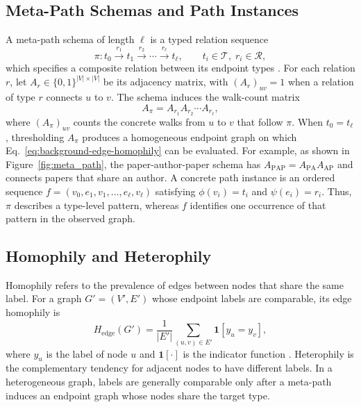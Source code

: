 \documentclass[sigconf,anonymous,review]{acmart}
\begin{document}
\subsection{Meta-Path Schemas and Path Instances}
A meta-path schema of length $\ell$ is a typed relation sequence
\begin{equation}
  \pi:
  t_0 \xrightarrow{r_1} t_1 \xrightarrow{r_2}\cdots
  \xrightarrow{r_\ell} t_\ell,
  \qquad t_i\in\mathcal{T},\; r_i\in\mathcal{R},
  \label{eq:background-metapath-schema}
\end{equation}
which specifies a composite relation between its endpoint types \cite{sun2011pathsim}. For each
relation $r$, let $A_r\in\{0,1\}^{|V|\times|V|}$ be its adjacency matrix, with
$(A_r)_{uv}=1$ when a relation of type $r$ connects $u$ to $v$. The schema induces the walk-count
matrix
\begin{equation}
  A_\pi=A_{r_1}A_{r_2}\cdots A_{r_\ell},
  \label{eq:background-metapath-adjacency}
\end{equation}
where $(A_\pi)_{uv}$ counts the concrete walks from $u$ to $v$ that follow $\pi$. When
$t_0=t_\ell$, thresholding $A_\pi$ produces a homogeneous endpoint graph on which
Eq.~\eqref{eq:background-edge-homophily} can be evaluated. For example, as shown in
Figure~\ref{fig:meta_path}, the
paper-author-paper schema has $A_{\mathrm{PAP}}=A_{\mathrm{PA}}A_{\mathrm{AP}}$ and connects
papers that share an author. A concrete path instance is an ordered sequence
$f=(v_0,e_1,v_1,\ldots,e_\ell,v_\ell)$ satisfying $\phi(v_i)=t_i$ and $\psi(e_i)=r_i$. Thus,
$\pi$ describes a type-level pattern, whereas $f$ identifies one occurrence of that pattern in
the observed graph.

\subsection{Homophily and Heterophily}
Homophily refers to the prevalence of edges between nodes that share the same label. For a graph
$G'=(V',E')$ whose endpoint labels are comparable, its edge homophily is
\begin{equation}
  H_{\mathrm{edge}}(G')
  = \frac{1}{|E'|}\sum_{(u,v)\in E'}\mathbf{1}[y_u=y_v],
  \label{eq:background-edge-homophily}
\end{equation}
where $y_u$ is the label of node $u$ and $\mathbf{1}[\cdot]$ is the indicator function
\cite{zhu2020beyond}. Heterophily is the complementary tendency for adjacent nodes to have
different labels. In a heterogeneous graph, labels are generally comparable only after a meta-path
induces an endpoint graph whose nodes share the target type.
\end{document}

